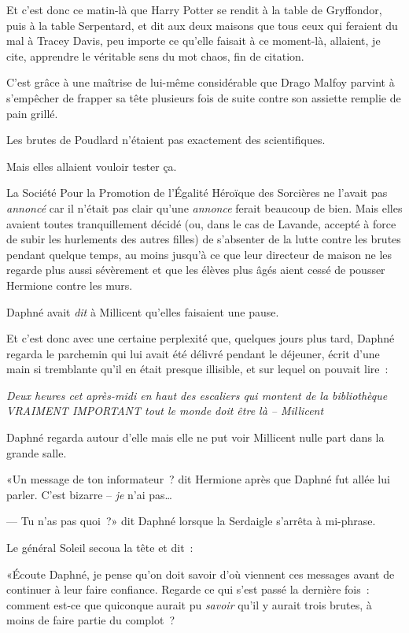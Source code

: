 \later

Et c'est donc ce matin-là que Harry Potter se rendit à la table de Gryffondor, puis à la table Serpentard, et dit aux deux maisons que tous ceux qui feraient du mal à Tracey Davis, peu importe ce qu'elle faisait à ce moment-là, allaient, je cite, apprendre le véritable sens du mot chaos, fin de citation.

C'est grâce à une maîtrise de lui-même considérable que Drago Malfoy parvint à s'empêcher de frapper sa tête plusieurs fois de suite contre son assiette remplie de pain grillé.

Les brutes de Poudlard n'étaient pas exactement des scientifiques.

Mais elles allaient vouloir tester ça.

\later

La Société Pour la Promotion de l'Égalité Héroïque des Sorcières ne l'avait pas \emph{annoncé} car il n'était pas clair qu'une \emph{annonce} ferait beaucoup de bien. Mais elles avaient toutes tranquillement décidé (ou, dans le cas de Lavande, accepté à force de subir les hurlements des autres filles) de s'absenter de la lutte contre les brutes pendant quelque temps, au moins jusqu'à ce que leur directeur de maison ne les regarde plus aussi sévèrement et que les élèves plus âgés aient cessé de pousser Hermione contre les murs.

Daphné avait \emph{dit} à Millicent qu'elles faisaient une pause.

Et c'est donc avec une certaine perplexité que, quelques jours plus tard, Daphné regarda le parchemin qui lui avait été délivré pendant le déjeuner, écrit d'une main si tremblante qu'il en était presque illisible, et sur lequel on pouvait lire~:

\emph{Deux heures cet après-midi en haut des escaliers qui montent de la bibliothèque VRAIMENT IMPORTANT tout le monde doit être là -- Millicent}

Daphné regarda autour d'elle mais elle ne put voir Millicent nulle part dans la grande salle.

«Un message de ton informateur~? dit Hermione après que Daphné fut allée lui parler. C'est bizarre -- \emph{je} n'ai pas…

--- Tu n'as pas quoi~?» dit Daphné lorsque la Serdaigle s'arrêta à mi-phrase.

Le général Soleil secoua la tête et dit~:

«Écoute Daphné, je pense qu'on doit savoir d'où viennent ces messages avant de continuer à leur faire confiance. Regarde ce qui s'est passé la dernière fois~: comment est-ce que quiconque aurait pu \emph{savoir} qu'il y aurait trois brutes, à moins de faire partie du complot~?

